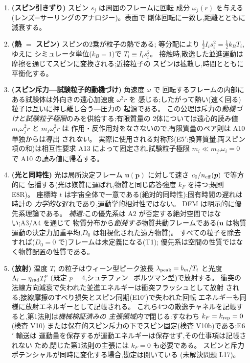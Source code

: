 \documentclass[a4paper,10pt,twocolumn]{ltjsarticle}
\newcommand{\vect}[1]{\bm{#1}}
\newcommand{\Dz}{D_0}
\begin{document}
\begin{enumerate}
\item[A8.]{\bf (スピン引きずり)} スピン $s_j$ は周囲のフレームに回転
成分 $\omega_j(r)$ を与える(レンズ=サーリングのアナロジー)。表面で
剛体回転に一致し,距離とともに減衰する。

\item[A9.]{\bf (熱 $=$ スピン)} スピンの2乗が粒子の熱である;
等分配により $\tfrac12 I_i s_i^2 = \tfrac12 k_B T_i$,ゆえに
シミュレータ単位($k_B = 1$)で $T_i \equiv I_i s_i^2$。
接触時,散逸した並進運動は摩擦を通じてスピンに変換される;近接粒子の
スピンは拡散し,時間とともに平衡化する。

\item[A10.]{\bf (スピン斥力---試験粒子的動機づけ)} 角速度 $\omega$ で
回転するフレームの内部にある試験体は外向きの遠心加速度 $\omega^2 r$ を
感じる;したがって熱い(速く回る)粒子は互いに押し離し合う---圧力の
起源である。
この公理は斥力の\emph{動機づけと試験粒子極限}のみを供給する;有限質量の
2体については遠心的読み値 $m_i\omega_j^2 r$ と $m_j\omega_i^2 r$ は
作用・反作用対をなさないので,有限質量のペア則は A10 単独からは導出
され\emph{ない}。
実際に使用される対称形(E5$'$:換算質量,両スピン項の和)は相互性要求
A13 によって固定され,試験粒子極限 $m_i \ll m_j$,$\omega_i = 0$ で
A10 の読み値に帰着する。

\item[A11.]{\bf (光と同時性)} 光は局所決定フレーム
$\vect{u}(\vect{p})$ に対して速さ $c_0/n_{\rm eff}(\vect{p})$ で等方的に
伝播する(光は媒質に運ばれ,物質と同じ応答強度 $k_F$ を持つ;規則
E8R)。
座標時 $t$ は宇宙全体で一意である(絶対的同時性);固有時間の遅れは時計の
\emph{力学的}な遅れであり,運動学的相対性ではない。
DFM は明示的に優先系理論である。
\emph{補遺:}この優先系は A2 が否定する絶対空間ではない;A3/A4 を通じて
物質分布から\emph{創発する}物質共動フレームである($\vect{u}$ は物質
運動の決定力加重平均,$\Dz$ は粗視化された遠方物質)。
すべての粒子を除去すれば($\Dz = 0$ で)フレームは未定義になる(T1);
優先系は空間の性質ではなく物質配置の性質である。

\item[A12$'$.]{\bf (放射)} 温度 $T_i$ の粒子はウィーン型ピーク波長
$\lambda_{\rm peak} = b_m/T_i$ と光度 $\Lambda_i = \eta_{\rm rad}T_i^p$
(既定 $p = 4$,シュテファン=ボルツマン型)で放射する。
衝突の法線方向減衰で失われた並進エネルギーは衝突フラッシュとして放射
される;接線摩擦のすべり損失とスピン同期(E10$'$)で失われた回転
エネルギーも同様に放射エネルギーとして記帳される。
これら4つの散逸チャネルを記帳すると,第1法則は\emph{機械検証済みの
主張領域内で}閉じる:すなわち $k_F = k_{\rm rep} = 0$(検査 V10)
または保存的スピン斥力の下でスピン固定(検査 V10b)である;E6$'$ 輸送は
運動量を保存するが運動エネルギーは保存せず,その仕事項は記帳されない
ため,閉じた第1法則の主張には $k_F = 0$ も必要である。
スピンと斥力ポテンシャルが同時に変化する場合,勘定は開いている
(未解決問題 L17)。


\end{enumerate}
\end{document}
